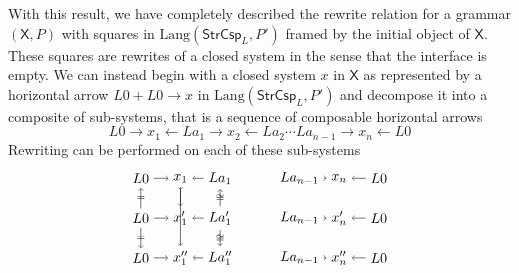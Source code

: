 \documentclass{amsart}
\newcommand{\X}{\cat{X}}
\newcommand{\StrCsp}{\cat{StrCsp}}
\newcommand{\Lang}{\mathrm{Lang}}
\newcommand{\cat}[1]{\mathsf{#1}}
\renewcommand{\gets}{\leftarrow}
\newcommand{\csp}[3]{#1 + #3 \to #2}
\theoremstyle{remark}
\theoremstyle{definition}
\begin{document}
With this result, we have completely described the rewrite relation
for a grammar $ ( \X , P ) $ with squares in
$ \Lang ( \StrCsp_L , P' ) $ framed by the initial object of $ \X $.
These squares are rewrites of a closed system in the sense that the
interface is empty.  We can instead begin with a closed system $ x $
in $ \X $ as represented by a horizontal arrow $ \csp{L0}{x}{L0} $ in
$ \Lang ( \StrCsp_L , P' ) $ and decompose it into a composite of
sub-systems, that is a sequence of composable horizontal
arrows
%
\[
  L0 \to x_1 \gets La_1 \to x_2 \gets La_2 \dotsm La_{n-1} \to x_n
  \gets L0
\]
%
Rewriting can be performed on each of these sub-systems
%
\[
  \begin{tikzpicture}
    \begin{scope}[shift={(0,4)}]
      \node (1) at (0,2) {$ L0 $};
      \node (2) at (1,2) {$ x_1 $};
      \node (3) at (2,2) {$ La_1 $};
      \node (4) at (0,1) {$ L0 $};
      \node (5) at (1,1) {$ x'_1 $};
      \node (6) at (2,1) {$ La'_1 $};
      \node (7) at (0,0) {$ L0 $};
      \node (8) at (1,0) {$ x''_1 $};
      \node (9) at (2,0) {$ La''_1 $};
      \draw [->] (1) to node [] {\scriptsize{$  $}} (2);
      \draw [->] (3) to node [] {\scriptsize{$  $}} (2);
      \draw [->] (4) to node [] {\scriptsize{$  $}} (5);
      \draw [->] (6) to node [] {\scriptsize{$  $}} (5);
      \draw [->] (7) to node [] {\scriptsize{$  $}} (8);
      \draw [->] (9) to node [] {\scriptsize{$  $}} (8);
      \draw [->] (4) to node [] {\scriptsize{$ = $}} (1);
      \draw [->] (4) to node [] {\scriptsize{$ = $}} (7);
      \draw [>->] (2) to node [] {\scriptsize{$  $}} (5);
      \draw [->] (2) to node [] {\scriptsize{$  $}} (8);
      \draw [->] (6) to node [] {\scriptsize{$ \cong  $}} (3);
      \draw [->] (6) to node [] {\scriptsize{$ \cong $}} (9);
    \end{scope}
    \begin{scope}[shift={(4,4)}]
      \node (1) at (0,2) {$ La_{n-1} $};
      \node (2) at (1,2) {$ x_n $};
      \node (3) at (2,2) {$ L0 $};
      \node (4) at (0,1) {$ La_{n-1} $};
      \node (5) at (1,1) {$ x'_n $};
      \node (6) at (2,1) {$ L0 $};
      \node (7) at (0,0) {$ La_{n-1} $};
      \node (8) at (1,0) {$ x''_n $};
      \node (9) at (2,0) {$ L0 $};
       \draw [->] (1) to node [] {\scriptsize{$  $}} (2);
      \draw [->] (3) to node [] {\scriptsize{$  $}} (2);
      \draw [->] (4) to node [] {\scriptsize{$  $}} (5);
      \draw [->] (6) to node [] {\scriptsize{$  $}} (5);
      \draw [->] (7) to node [] {\scriptsize{$  $}} (8);
      \draw [->] (9) to node [] {\scriptsize{$  $}} (8);

\end{scope}
\end{tikzpicture}\]
\end{document}
